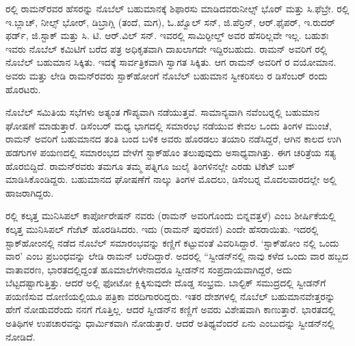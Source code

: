 ರಲ್ಲಿ ರಾಮನ್‍ರವರ ಹೆಸರನ್ನು ನೊಬೆಲ್ ಬಹುಮಾನಕ್ಕೆ ಶಿಫಾರಸು ಮಾಡಿದವರು\break ನೀಲ್ಸ್ ಭೊರ್ ಮತ್ತು ಸಿ.ಫೆಬ್ರೇ. ರಲ್ಲಿ ಇ.ಬ್ಲಾಚ್, ನೀಲ್ಸ್ ಭೋರ್, ಡಿಬ್ರಾಗ್ಲಿ (ತಂದೆ, ಮಗ), ಓ.ಖ್ವೊಲ್ ಸನ್, ಜಿ.ಪೆರ್ರಿನ್, ಆರ್.ಫೈಪರ್, ಇ.ರುದರ್ ಫರ್ಡ್, ಜಿ.ಸ್ಟಾಕ್ ಮತ್ತು ಸಿ. ಟಿ. ಆರ್.ವಿಲ್ ಸನ್. ಇವರಲ್ಲಿ ಸಾಮಿರ್‍ಫೀಲ್ಡ್ ಅವರ ಹೆಸರಿಲ್ಲವೇ ಇಲ್ಲ. ಬಹುಶಃ ಇವರು ನೊಬೆಲ್ ಕಮಿಟಿಗೆ ಬರೆದ ಪತ್ರ ಅಧಿಕೃತವಾಗಿ ದಾಖಲಾಗದೇ ಇದ್ದಿರಬಹುದು. ರಾಮನ್ ಅವರಿಗೆ ರಲ್ಲಿ ನೊಬೆಲ್ ಬಹುಮಾನ ಸಿಕ್ಕಿತು. ಇದಕ್ಕೆ ಸಾರ್ವತ್ರಿಕವಾಗಿ ಸ್ವಾಗತ ಸಿಕ್ಕಿತು. ಆಗ ರಾಮನ್ ಅವರಿಗೆ  ರ ವಯೋಮಾನ. ಅವರು ಮತ್ತು ಲೇಡಿ ರಾಮನ್‍ರವರು ಸ್ಟಾಕ್‍ಹೋಂಗೆ ನೊಬೆಲ್ ಬಹುಮಾನ ಸ್ವೀಕರಿಸಲು ರ ಡಿಸೆಂಬರ್  ರಂದು ಹೊರಟರು.

\newpage

ನೊಬೆಲ್ ಸಮಿತಿಯ ಸಭೆಗಳು ಅತ್ಯಂತ ಗೌಪ್ಯವಾಗಿ ನಡೆಯುತ್ತವೆ. ಸಾಮಾನ್ಯವಾಗಿ ನವೆಂಬರ್‍ನಲ್ಲಿ ಬಹುಮಾನ ಘೋಷಣೆ ಮಾಡುತ್ತಾರೆ. ಡಿಸೆಂಬರ್ ಮಧ್ಯ ಭಾಗದಲ್ಲಿ ಸಮಾರಂಭ ನಡೆಯುವ ಕೇವಲ ಒಂದು ತಿಂಗಳ ಮುಂಚೆ, ರಾಮನ್ ಅವರಿಗೆ ಬಹುಮಾನದ ತಂತಿ ಬಂದ ಬಳಿಕ ಅವರು ಹೊರಡಲು ತಯಾರಿ ನಡೆಸಿದ್ದರೆ, ಆಗಿನ ಕಾಲದ ಉಗಿ ಹಡಗುಗಳ ಪಯಣದಲ್ಲಿ ಸಮಾರಂಭದ ವೇಳೆಗೆ ಸ್ಟಾಕ್‍ಹೊಂ ತಲುಪುವುದು ಅಸಾಧ್ಯವಾಗಿತ್ತು. ಈಗ ಚರಿತ್ರೆಯ ಸತ್ಯ ಹೊರಬಿದ್ದಿದೆ. ರಾಮನ್‍ರವರು ತಮಗೂ ತಮ್ಮ ಪತ್ನಿಗೂ ಜುಲೈ ತಿಂಗಳಿನಲ್ಲೇ ಎರಡು ಟಿಕೆಟ್ ಬುಕ್ ಮಾಡಿಸಿಕೊಂಡಿದ್ದರು. ಬಹುಮಾನದ ಘೋಷಣೆಗೆ ನಾಲ್ಕು ತಿಂಗಳ ಮೊದಲು, ಡಿಸೆಂಬರ್‍ನ ಮೊದಲವಾರದಲ್ಲೇ ಅಲ್ಲಿ ಹಾಜರಾಗಿದ್ದರು.



ರಲ್ಲಿ ಕಲ್ಕತ್ತ ಮುನಿಸಿಪಲ್ ಕಾರ್ಪೋರೇಷನ್ ನವರು \textit{} (ರಾಮನ್ ಅವರಿಗೊಂದು ಬಿನ್ನವತ್ತಳೆ) ಎಂಬ ಶೀರ್ಷಿಕೆಯಲ್ಲಿ ಕಲ್ಕತ್ತ ಮುನಿಸಿಪಲ್ ಗೆಜೆಟ್ ಹೊರಡಿಸಿದರು. ಇದು  (ರಾಮನ್ ಪುರವಣಿ) ಎಂದೇ ಹೆಸರಾಯಿತು. ಇದರಲ್ಲಿ ಸ್ಟಾಕ್‍ಹೋಂನಲ್ಲಿ ನಡೆದ ನೊಬೆಲ್ ಸಮಾರಂಭವನ್ನು ಕಣ್ಣಿಗೆ ಕಟ್ಟುವಂತೆ ವಿವರಿಸಿದ್ದಾರೆ. ‘ಸ್ಟಾಕ್‍ಹೋಂ ನಲ್ಲಿ ಒಂದು ವಾರ’ ಎಂಬ ಪ್ರಬಂಧವನ್ನು ಲೇಡಿ ರಾಮನ್ ಬರೆದಿದ್ದಾರೆ. ಅದರಲ್ಲಿ\enginline{-} “ಸ್ವೀಡನ್‍ನಲ್ಲಿ ನಾವು ಕಳೆದ ಒಂದು ವಾರ ಹಬ್ಬದ ವಾತಾವರಣ, ಭಾರತದಲ್ಲಿದ್ದಂತೆ ಹೂಮಾಲೆಗಳೇನಾದರೂ ಸ್ವೀಡನ್‍ನ ಸಂಪ್ರದಾಯವಾಗಿದ್ದರೆ, ಅದು ಬೆಟ್ಟದಷ್ಟಾಗುತ್ತಿತ್ತು. ಆದರೆ ಅಲ್ಲಿ ಫೋಟೋ ಕ್ಲಿಕ್ಕಿಸುವುದೇ ದೊಡ್ಡ ಸಂಭ್ರಮ. ಬಾಲ್ಟಿಕ್ ಸಮುದ್ರದಲ್ಲಿ ಸ್ವೀಡನ್‍ಗೆ ಪಯಣಿಸುವ ದೋಣಿಯಲ್ಲಿಯೂ ಪತ್ರಿಕಾ ವರದಿಗಾರರಿದ್ದರು. ಇತರ ದೇಶಗಳಲ್ಲಿ ನೊಬೆಲ್ ಬಹುಮಾನವೇತ್ತರನ್ನು ಹೇಗೆ ನೋಡುವರೆಂದು ನನಗೆ ಗೊತ್ತಿಲ್ಲ. ಆದರೆ ಸ್ವೀಡನ್‍ನ ಕಣ್ಣಿಗೆ ಅವರು ವಿಶೇಷವಾಗಿ ಕಾಣುತ್ತಾರೆ. ಭಾರತದಲ್ಲಿ ಅತಿಥಿಗಳ ಉಪಚಾರವನ್ನು ಧಾರ್ಮಿಕವಾಗಿ ನೋಡುತ್ತಾರೆ. ಆದರೆ ಅತಿಥ್ಯವೆಂದರೆ ಏನು ಎಂಬುದನ್ನು ಸ್ವೀಡನ್‍ನಲ್ಲಿ ನೋಡಿದೆ.

